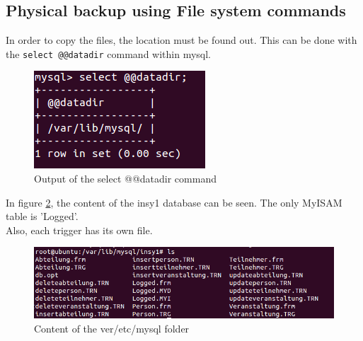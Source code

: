 \documentclass[10pt]{article}
\begin{document}
\subsection{Physical backup using File system commands}
\label{sec:cpmysql}
In order to copy the files, the location must be found out. This can be done with the \texttt{select @@datadir} command within mysql.
\begin{figure}[!h]
	\begin{center}
		\includegraphics[width=0.4\linewidth]{pictures/datadir_mysql}
		\caption{Output of the select @@datadir command}
		\label{differenceent}
	\end{center}
\end{figure}
\FloatBarrier
In figure \ref{content}, the content of the insy1 database can be seen. The only MyISAM table is 'Logged'.\\
Also, each trigger has its own file.
\FloatBarrier
\begin{figure}[!h]
	\begin{center}
		\includegraphics[width=0.8\linewidth]{pictures/ls_mysql_insy1}
		\caption{Content of the ver/etc/mysql folder}
		\label{content}
	\end{center}
\end{figure}
\FloatBarrier
\end{document}
